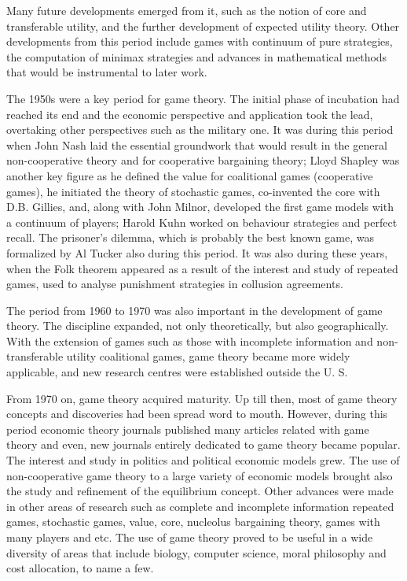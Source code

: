 \documentclass[]{report}
\begin{document}
Many future developments emerged from it, such as the notion of core and transferable utility, and the further development of expected utility theory. Other developments from this period include games with continuum of pure strategies, the computation of minimax strategies and advances in mathematical methods that would be instrumental to later work.

The 1950s were a key period for game theory. The initial phase of incubation had reached its end and the economic perspective and application took the lead, overtaking other perspectives such as the military one. It was during this period when John Nash laid the essential groundwork that would result in the general non-cooperative theory and for cooperative bargaining theory; Lloyd Shapley was another key figure as he defined the value for coalitional games (cooperative games), he initiated the theory of stochastic games, co-invented the core with D.B. Gillies, and, along with John Milnor, developed the first game models with a continuum of players; Harold Kuhn worked on behaviour strategies and perfect recall. The prisoner’s dilemma, which is probably the best known game, was formalized by Al Tucker also during this period. It was also during these years, when the Folk theorem appeared as a result of the interest and study of repeated games, used to analyse punishment strategies in collusion agreements.

The period from 1960 to 1970 was also important in the development of game theory. The discipline expanded, not only theoretically, but also geographically. With the extension of games such as those with incomplete information and non-transferable utility coalitional games, game theory became more widely applicable, and new research centres were established outside the U. S.

From 1970 on, game theory acquired maturity. Up till then, most of game theory concepts and discoveries had been spread word to mouth. However, during this period economic theory journals published many articles related with game theory and even, new journals entirely dedicated to game theory became popular. The interest and study in politics and political economic models grew. The use of non-cooperative game theory to a large variety of economic models brought also the study and refinement of the equilibrium concept. Other advances were made in other areas of research such as complete and incomplete information repeated games, stochastic games, value, core, nucleolus bargaining theory, games with many players and etc. The use of game theory proved to be useful in a wide diversity of areas that include biology, computer science, moral philosophy and cost allocation, to name a few.
\end{document}
